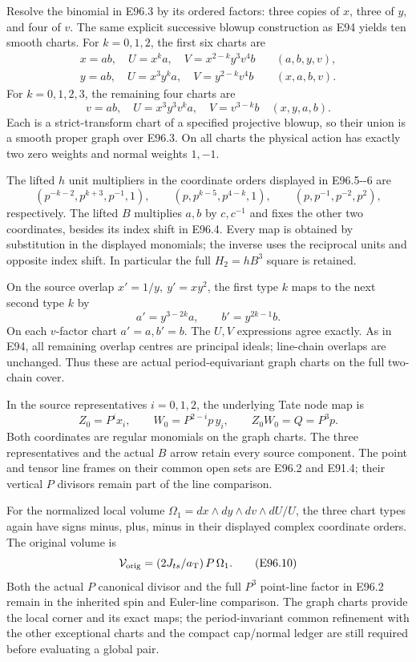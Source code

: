 Resolve the binomial in E96.3 by its ordered factors:
three copies of \(x\), three of \(y\), and four of
\(v\). The same explicit successive blowup construction
as E94 yields ten smooth charts. For \(k=0,1,2\),
the first six charts are
\[
\begin{aligned}
 x=ab,\quad U=x^ka,\quad
 V=x^{2-k}y^3v^4b
   &\quad(a,b,y,v),\\
 y=ab,\quad U=x^3y^ka,\quad
 V=y^{2-k}v^4b
   &\quad(x,a,b,v).
\end{aligned}                                                   \tag{E96.5}
\]
For \(k=0,1,2,3\), the remaining four charts are
\[
 v=ab,\quad U=x^3y^3v^ka,\quad V=v^{3-k}b
        \quad(x,y,a,b).                        \tag{E96.6}
\]
Each is a strict-transform chart of a specified
projective blowup, so their union is a smooth proper
graph over E96.3. On all charts the physical action
has exactly two zero weights and normal weights
\(1,-1\).

The lifted \(h\) unit multipliers in the coordinate
orders displayed in E96.5-\/-6 are
\[
 (p^{-k-2},p^{k+3},p^{-1},1),\qquad
 (p,p^{k-5},p^{4-k},1),\qquad
 (p,p^{-1},p^{-2},p^2),
 \tag{E96.7}
\]
respectively. The lifted \(B\) multiplies \(a,b\)
by \(c,c^{-1}\) and fixes the other two coordinates,
besides its index shift in E96.4. Every map is
obtained by substitution in the displayed monomials;
the inverse uses the reciprocal units and opposite
index shift. In particular the full \(H_2=hB^3\)
square is retained.

On the source overlap \(x'=1/y,\ y'=xy^2\), the
first type \(k\) maps to the next second type \(k\)
by
\[
 a'=y^{3-2k}a,\qquad b'=y^{2k-1}b.             \tag{E96.8}
\]
On each \(v\)-factor chart \(a'=a,b'=b\).
The \(U,V\) expressions agree exactly. As in E94,
all remaining overlap centres are principal ideals;
line-chain overlaps are unchanged. Thus these are
actual period-equivariant graph charts on the full
two-chain cover.

In the source representatives \(i=0,1,2\), the
underlying Tate node map is
\[
 Z_0=P^ix_i,\qquad
 W_0=P^{2-i}p\,y_i,\qquad Z_0W_0=Q=P^3p.
 \tag{E96.9}
\]
Both coordinates are regular monomials on the graph
charts. The three representatives and the actual
\(B\) arrow retain every source component.
The point and tensor line frames on their common
open sets are E96.2 and E91.4; their vertical \(P\)
divisors remain part of the line comparison.

For the normalized local volume
\(\Omega_1=dx\wedge dy\wedge dv\wedge dU/U\),
the three chart types again have signs minus, plus,
minus in their displayed complex coordinate orders.
The original volume is
\[
 \mathcal V_{\rm orig}
     =(2J_{ts}/a_{\rm T})\,P\,\Omega_1.          \tag{E96.10}
\]
Both the actual \(P\) canonical divisor and the full
\(P^3\) point-line factor in E96.2 remain in the
inherited spin and Euler-line comparison. The graph
charts provide the local corner and its exact maps;
the period-invariant common refinement with the other
exceptional charts and the compact cap/normal ledger
are still required before evaluating a global pair.

